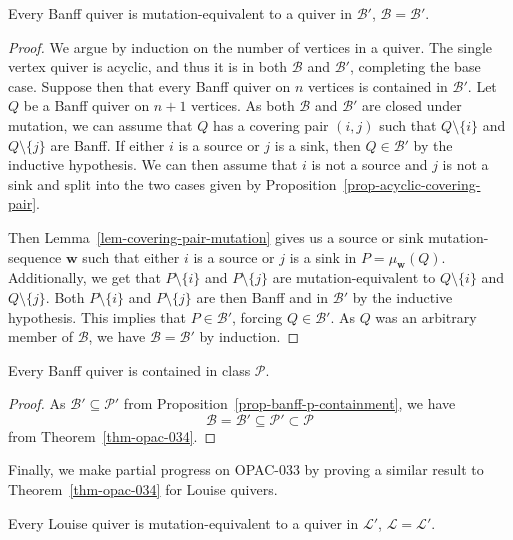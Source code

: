 \documentclass[ALCO,Unicode]{cedram}
\newcommand{\BB}{\mathcal{B}}
\newcommand{\PP}{\mathcal{P}}
\newcommand{\LL}{\mathcal{L}}
\newcommand{\bw}{{\boldsymbol{w}}}
\begin{document}
\begin{thm}[OPAC-034] \label{thm-opac-034}
    Every Banff quiver is mutation-equivalent to a quiver in $\BB'$, \ie $\BB = \BB'$.
\end{thm}

\begin{proof}
    We argue by induction on the number of vertices in a quiver.
    The single vertex quiver is acyclic, and thus it is in both $\BB$ and $\BB'$, completing the base case.
    Suppose then that every Banff quiver on $n$ vertices is contained in $\BB'$.
    Let $Q$ be a Banff quiver on $n+1$ vertices.
    As both $\BB$ and $\BB'$ are closed under mutation, we can assume that $Q$ has a covering pair $(i,j)$ such that $Q \setminus \{i\}$ and $Q \setminus \{j\}$ are Banff.
    If either $i$ is a source or $j$ is a sink, then $Q \in \BB'$ by the inductive hypothesis.
    We can then assume that $i$ is not a source and $j$ is not a sink and split into the two cases given by Proposition~\ref{prop-acyclic-covering-pair}.

    Then Lemma~\ref{lem-covering-pair-mutation} gives us a source or sink mutation-sequence $\bw$ such that either $i$ is a source or $j$ is a sink in $P = \mu_\bw(Q)$.
    Additionally, we get that $P \setminus \{i\}$ and $P \setminus \{j\}$ are mutation-equivalent to $Q \setminus \{i\}$ and $Q \setminus \{j\}$.
    Both $P \setminus \{i\}$ and $P \setminus \{j\}$ are then Banff and in $\BB'$ by the inductive hypothesis.
    This implies that $P \in \BB'$, forcing $Q \in \BB'$.
    As $Q$ was an arbitrary member of $\BB$, we have $\BB = \BB'$ by induction.
\end{proof}

\begin{coro}[OPAC-035] \label{cor-opac-035}
    Every Banff quiver is contained in class $\PP$.
\end{coro}

\begin{proof}
    As $\BB' \subseteq \PP'$ from Proposition~\ref{prop-banff-p-containment},  we have
    $$\BB = \BB' \subseteq \PP' \subset \PP$$
    from Theorem~\ref{thm-opac-034}.
\end{proof}

Finally, we make partial progress on OPAC-033 by proving a similar result to Theorem~\ref{thm-opac-034} for Louise quivers.

\begin{coro} \label{cor-louise-louise-prime}
    Every Louise quiver is mutation-equivalent to a quiver in $\LL'$, \ie $\LL= \LL'$.
\end{coro}
\end{document}
